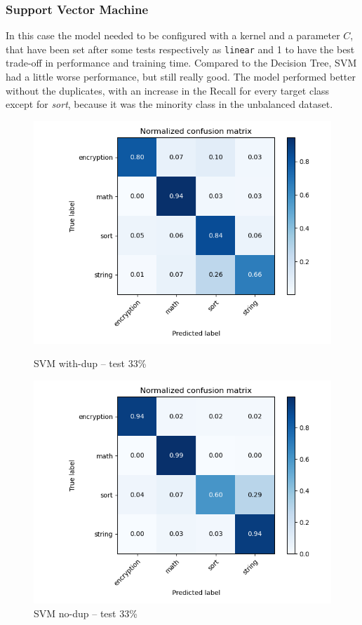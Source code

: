 \documentclass[11pt]{article}
\begin{document}
	\subsubsection{Support Vector Machine}
	In this case the model needed to be configured with a kernel and a parameter
	$C$, that have been set after some tests respectively as \texttt{linear} and
	1 to have the best trade-off in performance and training time.
	Compared to the Decision Tree, SVM had a little worse performance, but still
	really good.
	The model performed better without the duplicates, with an increase in the
	Recall for every target class except for \textit{sort}, because it was the
	minority class in the unbalanced dataset.
	\begin{figure}[H]
		\centering
		\begin{minipage}{.5\textwidth}
		  \centering
		  \includegraphics[width=\linewidth]{assets/svc_dup_0.333.png}
		  \caption{SVM with-dup -- test 33\%}
		\end{minipage}%
		\begin{minipage}{.5\textwidth}
		  \centering
		  \includegraphics[width=\linewidth]{assets/svc_nodup_0.333.png}
		  \caption{SVM no-dup -- test 33\%}
		\end{minipage}
	\end{figure}
\end{document}
